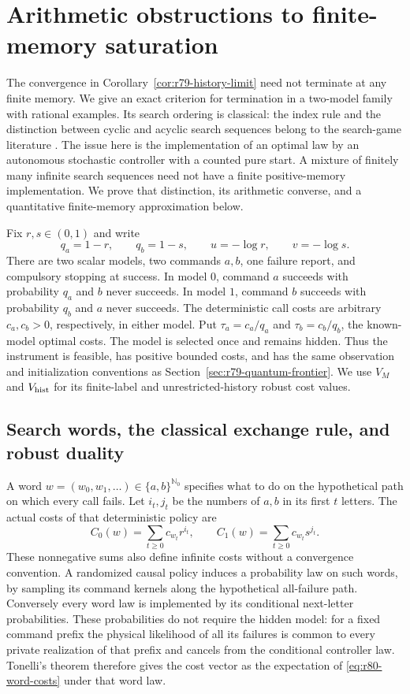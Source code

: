 \section{Arithmetic obstructions to finite-memory saturation}
\label{sec:r80-arithmetic-saturation}

The convergence in Corollary~\ref{cor:r79-history-limit} need not
terminate at any finite memory.  We give an exact criterion for
termination in a two-model family with rational examples.  Its search
ordering is classical: the index rule and the distinction between
cyclic and acyclic search sequences belong to the search-game
literature \cite{Matula1964,ClarksonLinGlazebrook2023,BuiLidbetterLin2023}.  The issue here is
the implementation of an optimal law by an autonomous stochastic
controller with a counted pure start.  A mixture of finitely many
infinite search sequences need not have a finite positive-memory
implementation.  We prove that distinction, its arithmetic converse,
and a quantitative finite-memory approximation below.

Fix $r,s\in(0,1)$ and write
\[
 q_a=1-r,\qquad q_b=1-s,\qquad
 u=-\log r,\qquad v=-\log s.
\]
There are two scalar models, two commands $a,b$, one failure report,
and compulsory stopping at success.  In model $0$, command $a$
succeeds with probability $q_a$ and $b$ never succeeds.  In model $1$,
command $b$ succeeds with probability $q_b$ and $a$ never succeeds.
The deterministic call costs are arbitrary $c_a,c_b>0$, respectively,
in either model.  Put $\tau_a=c_a/q_a$ and $\tau_b=c_b/q_b$,
the known-model optimal costs.  The model is selected once and remains hidden.
Thus the instrument is feasible, has positive bounded costs, and
has the same observation and initialization conventions as
Section~\ref{sec:r79-quantum-frontier}.  We use $V_M$ and
$V_{\rm hist}$ for its finite-label and unrestricted-history robust
cost values.

\subsection{Search words, the classical exchange rule, and robust duality}

A word $w=(w_0,w_1,\ldots)\in\{a,b\}^{\mathbb N_0}$ specifies what
to do on the hypothetical path on which every call fails.  Let
$i_t,j_t$ be the numbers of $a,b$ in its first $t$ letters.  The
actual costs of that deterministic policy are
\begin{equation}\label{eq:r80-word-costs}
 C_0(w)=\sum_{t\ge0}c_{w_t}r^{i_t},\qquad
 C_1(w)=\sum_{t\ge0}c_{w_t}s^{j_t}.
\end{equation}
These nonnegative sums also define infinite costs without a
convergence convention.  A randomized causal policy induces a
probability law on such words, by sampling its command kernels
along the hypothetical all-failure path.  Conversely every word
law is implemented by its conditional next-letter probabilities.
These probabilities do not require the hidden model: for a fixed
command prefix the physical likelihood of all its failures is
common to every private realization of that prefix and cancels
from the conditional controller law.  Tonelli's theorem therefore
gives the cost vector as the expectation of
\eqref{eq:r80-word-costs} under that word law.

